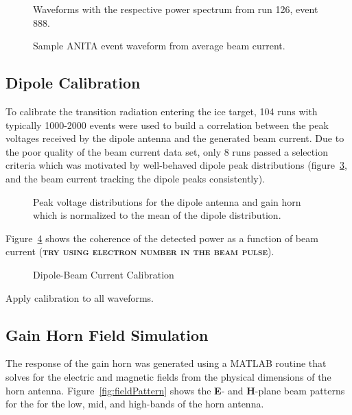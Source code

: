 \begin{figure}[htbp]
\centering
\epsfxsize=4.0in
\caption{Waveforms with the respective power spectrum from run 126, event 888.}
\label{fig:anitaEvtWfm}
\end{figure}

\begin{figure}[htbp]
\centering
\caption{Sample ANITA event waveform from average beam current.}
\label{fig:EvtWfm}
\end{figure}

\subsection{Dipole Calibration}
\label{ss:dipoleCal}
To calibrate the transition radiation entering the ice target, 104 runs with typically 1000-2000 events were used to build a correlation between the peak voltages received by the dipole antenna and the generated beam current.  Due to the poor quality of the beam current data set, only 8 runs passed a selection criteria which was motivated by well-behaved dipole peak distributions (figure~\ref{fig:dipHrnDist}, and the beam current tracking the dipole peaks consistently).

\begin{figure}[htbp]
\centering
\epsfxsize=4.0in
\caption{Peak voltage distributions for the dipole antenna and gain horn which is normalized to the mean of the dipole distribution.}
\label{fig:dipHrnDist}
\end{figure}

\par Figure~\ref{fig:dipoleCal} shows the coherence of the detected power as a function of beam current (\textbf{\textsc{try using electron number in the beam pulse}}).

\begin{figure}[htbp]
\centering
\epsfxsize=4.0in
\caption{Dipole-Beam Current Calibration}
\label{fig:dipoleCal}
\end{figure}

\noindent Apply calibration to all waveforms.

\subsection{Gain Horn Field Simulation}
\label{ss:gainHorn}
The response of the gain horn was generated using a MATLAB routine that solves for the electric and magnetic fields from the physical dimensions of the horn antenna.  Figure~\ref{fig:fieldPattern} shows the \textbf{E}- and \textbf{H}-plane beam patterns for the for the low, mid, and high-bands of the horn antenna.

